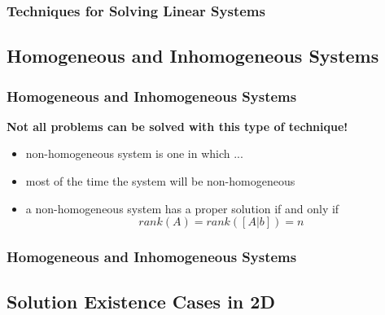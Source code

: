 \documentclass[fleqn]{beamer} %
\newcommand{\sectionIIIsubsectionItitle}{Techniques for Solving Linear Systems}
\newcommand{\sectionIIIsubsectionIItitle}{Homogeneous and Inhomogeneous Systems}
\newcommand{\sectionIIIsubsectionIIItitle}{Solution Existence Cases in 2D}
\begin{document}
			\begin{frame}
				\frametitle{\sectionIIIsubsectionItitle}
				\bigskip

			  
				\btVFill
			\end{frame}

		\subsection{\sectionIIIsubsectionIItitle}\label{sectionIIIsubsectionII}	

			\begin{frame}
				\frametitle{\sectionIIIsubsectionIItitle}
				\bigskip

				\textbf{ Not all problems can be solved with this type of technique!} \vspace{3mm}\\	
				\begin{itemize}
					\item {\PR non-homogeneous} system is one in which ... \vspace{10mm}\\
					\item most of the time the system will be {\PR non-homogeneous} \vspace{10mm}\\
					\item a {\PR non-homogeneous} system has a {\BL proper solution} if and only if\vspace{2mm}\\
					\[rank(A)=rank([A | b])=n\]
				\end{itemize}
				
				\btVFill
			\end{frame}

			\begin{frame}
				\frametitle{\sectionIIIsubsectionIItitle}
				\bigskip
				

				\btVFill
			\end{frame}

		\subsection{\sectionIIIsubsectionIIItitle}\label{sectionIIIsubsectionIII}
\end{document}
